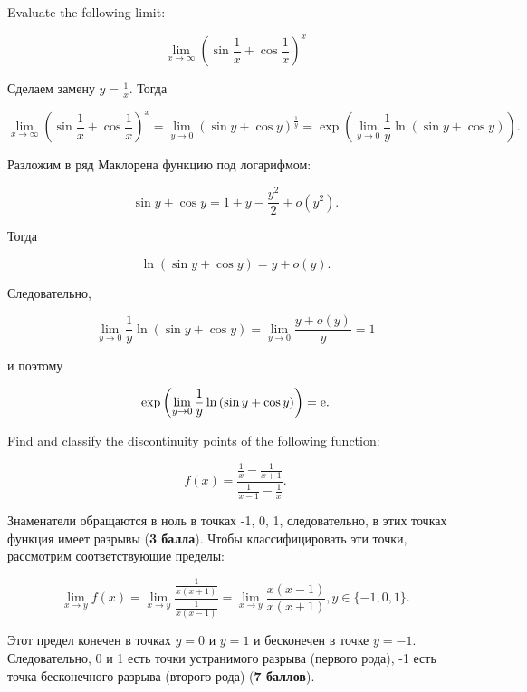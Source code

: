 \documentclass[addpoints]{exam} %
\begin{document}
\begin{questions}


\question[10] Evaluate the following limit:

\[\lim_{x \to \infty} \left( \sin \frac{1}{x} + \cos \frac{1}{x} \right)^x\]

\begin{solution}

Сделаем замену $y=\frac{1}{x}$. Тогда

\[\lim_{x \to \infty} \left( \sin \frac{1}{x} + \cos \frac{1}{x} \right)^x = \lim_{y \to 0} \left( \sin y + \cos y \right)^\frac{1}{y} = \exp \left( \lim_{y \to 0} \frac{1}{y} \ln \left( \sin y + \cos y \right) \right). \]

Разложим в ряд Маклорена функцию под логарифмом:

\[ \sin y + \cos y = 1+y-\frac{y^2}{2} + o(y^2).\]

Тогда

\[ \ln \left( \sin y + \cos y \right) = y+o(y). \]

Следовательно,

\[ \lim_{y \to 0} \frac{1}{y} \ln \left( \sin y + \cos y \right) = \lim_{y \to 0} \frac{y+o(y)}{y} =1 \]

и поэтому

\[ \exp \left( \lim_{y \to 0} \frac{1}{y} \ln \left( \sin y + \cos y \right) \right) ={\rm e}. \]

\end{solution}

\question[10] Find and classify the discontinuity points of the following function:

\[
f(x) = \frac{\frac{1}{x}-\frac{1}{x+1}}{\frac{1}{x-1}-\frac{1}{x}}.
\]

\begin{solution}

Знаменатели обращаются в ноль в точках -1, 0, 1, следовательно, в этих точках функция имеет разрывы (\textbf{3 балла}). Чтобы классифицировать эти точки, рассмотрим соответствующие пределы:

\[ \lim_{x \to y} f(x) = \lim_{x \to y} \frac{\frac{1}{x (x+1)}}{\frac{1}{x(x-1)}} = \lim_{x \to y} \frac{x (x-1)}{x (x+1)}, y \in \{-1,0,1\}.\]

Этот предел конечен в точках $y=0$ и $y=1$ и бесконечен в точке $y=-1$. Следовательно, 0 и 1 есть точки устранимого разрыва (первого рода), -1 есть точка бесконечного разрыва (второго рода) (\textbf{7 баллов}).

\end{solution}





\end{questions}
\end{document}
